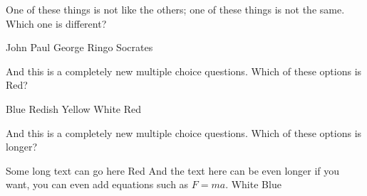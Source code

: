 \question[5]
One of these things is not like the others; one of these
things is not the same. Which one is different?
\droppoints

\begin{checkboxes}
\choice John
\choice Paul
\choice George
\choice Ringo
\CorrectChoice Socrates
\end{checkboxes}

\question[5]
And this is a completely new multiple choice questions. Which of these options is Red?
\droppoints

\begin{checkboxes}
\choice Blue
\choice Redish
\choice Yellow
\choice White
\CorrectChoice Red
\end{checkboxes}

\question[5]
And this is a completely new multiple choice questions. Which of these options is longer?
\droppoints

\begin{checkboxes}
\choice Some long text can go here
\choice Red
\CorrectChoice And the text here can be even longer if you want, you can even add equations such as $F=ma$.
\choice White
\choice Blue
\end{checkboxes}
